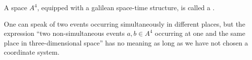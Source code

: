 A space $A^4$, equipped with a galilean space-time structure, is called a .

One can speak of two events occurring simultaneously in different places, but the expression ``two non-simultaneous events $a, b \in A^4$ occurring at one and the same place in three-dimensional space'' has no meaning as long as we have not chosen a coordinate system.
